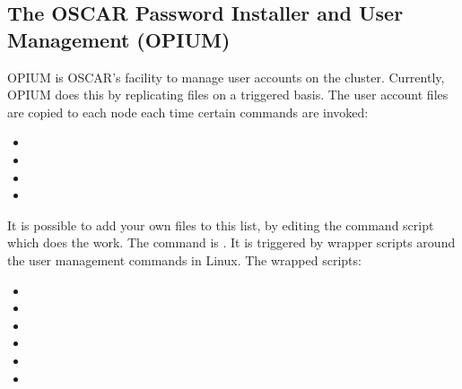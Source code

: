 %
%
%

\subsection{The OSCAR Password Installer and User Management (OPIUM)}
\label{app:opium-overview}

OPIUM is OSCAR's facility to manage user accounts on the cluster.
Currently, OPIUM does this by replicating files on a triggered basis.
The user account files are copied to each node each time certain
commands are invoked:

\begin{itemize}
\item {}
\item {}
\item {}
\item {}
\end{itemize}

It is possible to add your own files to this list, by editing the
command script which does the work.  The command is
.  It is triggered by wrapper scripts
around the user management commands in Linux.  The wrapped scripts:

\begin{itemize}
\item {}
\item {}
\item {}
\item {}
\item {}
\item {}
\end{itemize}

